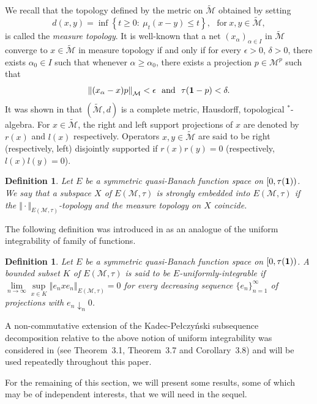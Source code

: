 \documentclass[12pt]{amsart}
\let\cal\mathcal
\newtheorem{definition}[theorem]{Definition}
\def\m{{\cal M}}
\numberwithin{equation}{section}
\numberwithin{theorem}{section}
\begin{document}
We recall that 
the topology defined by the metric on $\widetilde{\m}$ obtained by setting
$$d(x,y)=\inf\left\{t\geq 0:\ \mu_t(x-y)\leq t \right\}, 
\ \ \ \text{for}\ 
x, y \in \widetilde{\m},$$
is called the {\it measure topology}. It is well-known that a net
$(x_\alpha)_{\alpha \in I}$ in $\widetilde{\m}$  converge to 
$x \in \widetilde{\m}$ in measure  topology if and only if
for every $\epsilon >0$, $\delta >0$, there exists $\alpha_0 \in I$
such that whenever $\alpha \geq \alpha_0$, there exists a projection
$p \in \m^p$ such that
   $$\left\Vert (x_\alpha - x)p \right\Vert_{\m} <\epsilon \ \
\text{and}\ \ \tau({\bf 1}-p)<\delta.$$
It was shown in \cite{N} that $(\widetilde{\m}, d)$ is 
a complete metric, Hausdorff, topological ${}^*$-algebra.
For $x \in \widetilde{\m}$, the right and left support projections of $x$
are denoted by $r(x)$ and $l(x)$ respectively. Operators 
$x, y \in \widetilde{\m}$ are said to be right (respectively, left)
disjointly supported if $r(x)r(y)=0$ (respectively, $l(x)l(y)=0$).
\smallskip

\begin{definition} 
Let $E$ be a symmetric quasi-Banach function space on $[0,\tau({\bf 1}))$.
We say that a subspace $X$ of $E(\m,\tau)$ is strongly embedded into 
$E(\m,\tau)$
if the $\Vert \cdot \Vert_{E(\m,\tau)}$-topology and the measure topology
on $X$ coincide.
\end{definition}

\smallskip

The following definition was introduced in \cite{Ran10} as an analogue of
the uniform integrability of family of functions.
\begin{definition}
Let  $E$ be a symmetric  quasi-Banach function space on $[0,\tau({\bf 1}))$.
A bounded subset $K$ of $E(\cal{M}, \tau)$ is said to be
{ $E$-uniformly-integrable} if $\lim\limits_{n \to \infty} \sup\limits_{x \in K}
\left\Vert e_n x e_n \right\Vert_{E(\cal{M},\tau)} = 0$
for every decreasing sequence $\{e_n\}_{n=1}^\infty$ of projections with
$e_n \downarrow_n  0$.
\end{definition}

A non-commutative extension of the Kadec-Pe\l czy\'nski subsequence 
decomposition relative to the above notion of uniform integrability
was considered in \cite{Ran10} (see Theorem~3.1, Theorem~3.7 and
Corollary~3.8) and will be used repeatedly throughout 
this paper.
 

\smallskip

For the remaining of this section, we will present some results, 
some of which may be of independent interests, that we will need 
in the sequel.
\end{document}
